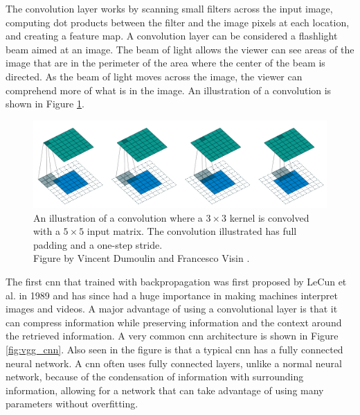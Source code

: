     The convolution layer works by scanning small filters across the input image, computing dot products between the filter and the image pixels at each location, and creating a feature map. A convolution layer can be considered a flashlight beam aimed at an image. The beam of light allows the viewer can see areas of the image that are in the perimeter of the area where the center of the beam is directed. As the beam of light moves across the image, the viewer can comprehend more of what is in the image. An illustration of a convolution is shown in Figure \ref{fig:convolutuon}.

    \begin{figure}[htb]
        \centering
        \includegraphics[width=\linewidth]{images/convolution.png}
        \caption[Illustration of a convolution.]{An illustration of a convolution where a $3 \times 3$ kernel is convolved with a $5 \times 5$ input matrix. The convolution illustrated has full padding and a one-step stride.\\
        Figure by Vincent Dumoulin and Francesco Visin \cite{dumoulinGuideConvolutionArithmetic2018}.}
        \label{fig:convolutuon}
    \end{figure}


    The first \gls{cnn} that trained with backpropagation was first proposed by LeCun et al. in 1989 \cite{lecunHandwrittenDigitRecognition1989} and has since had a huge importance in making machines interpret images and videos. A major advantage of using a convolutional layer is that it can compress information while preserving information and the context around the retrieved information. A very common \gls{cnn} architecture is shown in Figure \ref{fig:vgg_cnn}. Also seen in the figure is that a typical \gls{cnn} has a fully connected neural network. A \gls{cnn} often uses fully connected layers, unlike a normal neural network, because of the condensation of information with surrounding information, allowing for a network that can take advantage of using many parameters without overfitting.  

